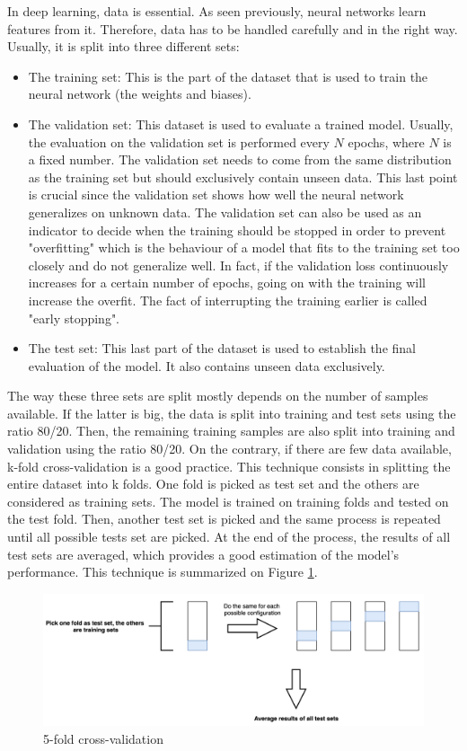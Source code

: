 \setlength{\marginparwidth}{3cm}\leavevmode {}In deep learning, data is essential. As seen previously, neural networks learn features from it. Therefore, data has to be handled carefully and in the right way. Usually, it is split into three different sets:
\begin{itemize}
\item The training set: This is the part of the dataset that is used to train the neural network (the weights and biases).
\item The validation set: This dataset is used to evaluate a trained model. Usually, the evaluation on the validation set is performed every $N$ epochs, where $N$ is a fixed number. The validation set needs to come from the same distribution as the training set but should exclusively contain unseen data. This last point is crucial since the validation set shows how well the neural network generalizes on unknown data. The validation set can also be used as an indicator to decide when the training should be stopped in order to prevent "overfitting" which is the behaviour of a model that fits to the training set too closely and do not generalize well. In fact, if the validation loss continuously increases for a certain number of epochs, going on with the training will increase the overfit. The fact of interrupting the training earlier is called "early stopping".
\item The test set: This last part of the dataset is used to establish the final evaluation of the model. It also contains unseen data exclusively. 
\end{itemize}
The way these three sets are split mostly depends on the number of samples available. If the latter is big, the data is split into training and test sets using the ratio 80/20. Then, the remaining training samples are also split into training and validation using the ratio 80/20. On the contrary, if there are few data available, k-fold cross-validation is a good practice. This technique consists in splitting the entire dataset into k folds. One fold is picked as test set and the others are considered as training sets. The model is trained on training folds and tested on the test fold. Then, another test set is picked and the same process is repeated until all possible tests set are picked. At the end of the process, the results of all test sets are averaged, which provides a good estimation of the model's performance. This technique is summarized on Figure \ref{cross_validation}.

\begin{figure}[!h]
\centering
\includegraphics[width=1\textwidth, keepaspectratio=true]{./figures/cross_validation.png}
\caption{5-fold cross-validation}
\label{cross_validation}
\end{figure}


